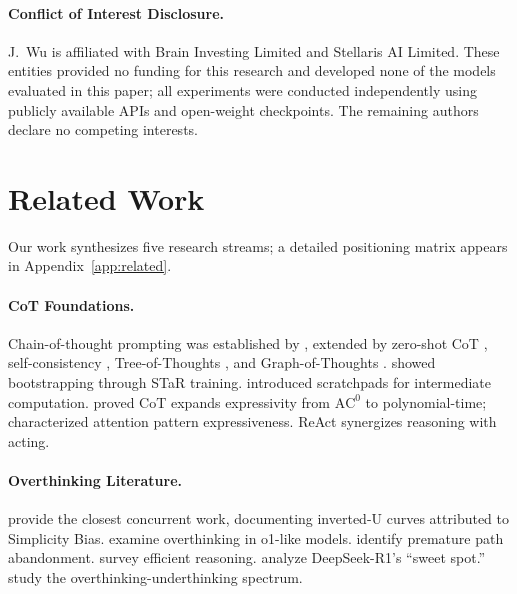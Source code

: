 \documentclass{article}
\theoremstyle{plain}
\theoremstyle{definition}
\theoremstyle{remark}
\begin{document}
\paragraph{Conflict of Interest Disclosure.} J.\ Wu is affiliated with Brain Investing Limited and Stellaris AI Limited. These entities provided no funding for this research and developed none of the models evaluated in this paper; all experiments were conducted independently using publicly available APIs and open-weight checkpoints. The remaining authors declare no competing interests.


\section{Related Work}
\label{sec:related}

Our work synthesizes five research streams; a detailed positioning matrix appears in Appendix~\ref{app:related}.

\paragraph{CoT Foundations.} Chain-of-thought prompting was established by \citet{wei2022chain}, extended by zero-shot CoT \citep{kojima2022large}, self-consistency \citep{wang2023selfconsistency}, Tree-of-Thoughts \citep{yao2023tree}, and Graph-of-Thoughts \citep{besta2024graph}. \citet{zelikman2022star} showed bootstrapping through STaR training. \citet{nye2021improving} introduced scratchpads for intermediate computation. \citet{li2024chain} proved CoT expands expressivity from $\text{AC}^0$ to polynomial-time; \citet{feng2023expressiveness} characterized attention pattern expressiveness. ReAct \citep{yao2022react} synergizes reasoning with acting.

\paragraph{Overthinking Literature.} \citet{wu2025more} provide the closest concurrent work, documenting inverted-U curves attributed to Simplicity Bias. \citet{chen2025do} examine overthinking in o1-like models. \citet{wang2026thoughts} identify premature path abandonment. \citet{sui2025stop} survey efficient reasoning. \citet{marjanovic2025thoughtology} analyze DeepSeek-R1's ``sweet spot.'' \citet{su2025between} study the overthinking-underthinking spectrum.
\end{document}
